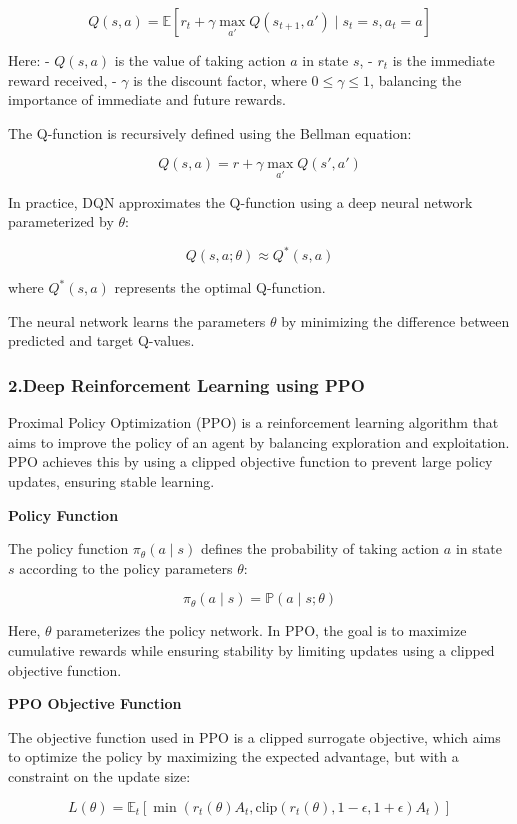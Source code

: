 \[
Q(s, a) = \mathbb{E} \left[ r_t + \gamma \max_{a'} Q(s_{t+1}, a') \mid s_t = s, a_t = a \right]
\]

Here:
- \(Q(s, a)\) is the value of taking action \(a\) in state \(s\),
- \(r_t\) is the immediate reward received,
- \(\gamma\) is the discount factor, where \(0 \leq \gamma \leq 1\), balancing the importance of immediate and future rewards.

The Q-function is recursively defined using the Bellman equation:

\[
Q(s, a) = r + \gamma \max_{a'} Q(s', a')
\]

In practice, DQN approximates the Q-function using a deep neural network parameterized by \(\theta\):

\[
Q(s, a; \theta) \approx Q^*(s, a)
\]

where \(Q^*(s, a)\) represents the optimal Q-function. 

The neural network learns the parameters \(\theta\) by minimizing the difference between predicted and target Q-values.


\subsubsection{2.Deep Reinforcement Learning using PPO}

Proximal Policy Optimization (PPO) is a reinforcement learning algorithm that aims to improve the policy of an agent by balancing exploration and exploitation\cite{schulman2017ppo}. 
PPO achieves this by using a clipped objective function to prevent large policy updates, ensuring stable learning.

\textbf{Policy Function}

The policy function \(\pi_\theta(a \mid s)\) defines the probability of taking action \(a\) in state \(s\) according to the policy parameters \(\theta\):

\[
\pi_\theta(a \mid s) = \mathbb{P}(a \mid s; \theta)
\]

Here, \(\theta\) parameterizes the policy network. In PPO, the goal is to maximize cumulative rewards while ensuring stability by limiting updates using a clipped objective function.

\textbf{PPO Objective Function}

The objective function used in PPO is a clipped surrogate objective, which aims to optimize the policy by maximizing the expected advantage, but with a constraint on the update size:

\[
L(\theta) = \mathbb{E}_t \left[ \min \left( r_t(\theta) A_t, \text{clip}(r_t(\theta), 1-\epsilon, 1+\epsilon) A_t \right) \right]
\]

